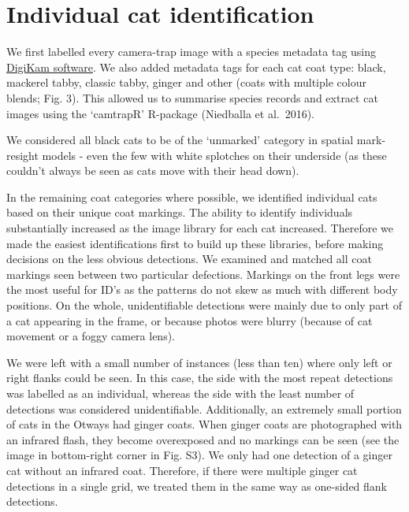 \documentclass[]{elsarticle} %
\begin{document}
\newpage

\hypertarget{density-app-id}{%
\section{Individual cat identification}\label{density-app-id}}

We first labelled every camera-trap image with a species metadata tag using \href{https://www.digikam.org}{DigiKam software}. We also added metadata tags for each cat coat type: black, mackerel tabby, classic tabby, ginger and other (coats with multiple colour blends; Fig. 3). This allowed us to summarise species records and extract cat images using the `camtrapR' R-package (Niedballa et al.~2016).

We considered all black cats to be of the `unmarked' category in spatial mark-resight models - even the few with white splotches on their underside (as these couldn't always be seen as cats move with their head down).

In the remaining coat categories where possible, we identified individual cats based on their unique coat markings. The ability to identify individuals substantially increased as the image library for each cat increased. Therefore we made the easiest identifications first to build up these libraries, before making decisions on the less obvious detections. We examined and matched all coat markings seen between two particular defections. Markings on the front legs were the most useful for ID's as the patterns do not skew as much with different body positions. On the whole, unidentifiable detections were mainly due to only part of a cat appearing in the frame, or because photos were blurry (because of cat movement or a foggy camera lens).

We were left with a small number of instances (less than ten) where only left or right flanks could be seen. In this case, the side with the most repeat detections was labelled as an individual, whereas the side with the least number of detections was considered unidentifiable. Additionally, an extremely small portion of cats in the Otways had ginger coats. When ginger coats are photographed with an infrared flash, they become overexposed and no markings can be seen (see the image in bottom-right corner in Fig. S3). We only had one detection of a ginger cat without an infrared coat. Therefore, if there were multiple ginger cat detections in a single grid, we treated them in the same way as one-sided flank detections.
\end{document}
